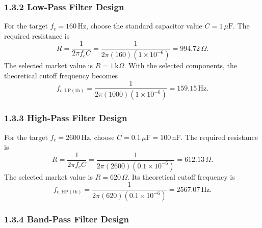 \documentclass[12pt,a4paper]{article}
\begin{document}
\subsubsection*{1.3.2 Low-Pass Filter Design}

For the target $f_c=160\,\mathrm{Hz}$, choose the standard capacitor value $C=1\,\mu\mathrm{F}$. The required resistance is
\begin{equation}
  R=\frac{1}{2\pi f_cC}
  =\frac{1}{2\pi(160)(1\times10^{-6})}
  =994.72\,\Omega.
  \label{eq:lp-r-calc}
\end{equation}
The selected market value is $R=1\,\mathrm{k}\Omega$. With the selected components, the theoretical cutoff frequency becomes
\begin{equation}
  f_{c,\mathrm{LP(th)}}
  =\frac{1}{2\pi(1000)(1\times10^{-6})}
  =159.15\,\mathrm{Hz}.
  \label{eq:lp-selected-fc}
\end{equation}

\subsubsection*{1.3.3 High-Pass Filter Design}

For the target $f_c=2600\,\mathrm{Hz}$, choose $C=0.1\,\mu\mathrm{F}=100\,\mathrm{nF}$. The required resistance is
\begin{equation}
  R=\frac{1}{2\pi f_cC}
  =\frac{1}{2\pi(2600)(0.1\times10^{-6})}
  =612.13\,\Omega.
  \label{eq:hp-r-calc}
\end{equation}
The selected market value is $R=620\,\Omega$. Its theoretical cutoff frequency is
\begin{equation}
  f_{c,\mathrm{HP(th)}}
  =\frac{1}{2\pi(620)(0.1\times10^{-6})}
  =2567.07\,\mathrm{Hz}.
  \label{eq:hp-selected-fc}
\end{equation}

\subsubsection*{1.3.4 Band-Pass Filter Design}
\end{document}
